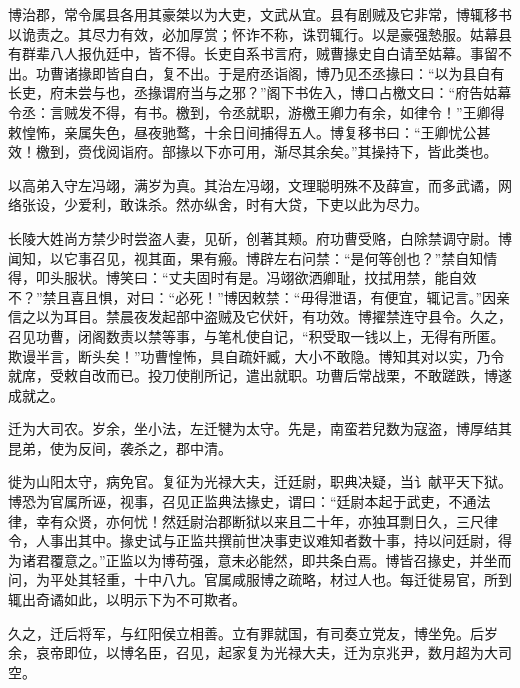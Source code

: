 \documentclass[12pt,UTF8]{ctexbook}
\begin{document}
博治郡，常令属县各用其豪桀以为大吏，文武从宜。县有剧贼及它非常，博辄移书以诡责之。其尽力有效，必加厚赏；怀诈不称，诛罚辄行。以是豪强慹服。姑幕县有群辈八人报仇廷中，皆不得。长吏自系书言府，贼曹掾史自白请至姑幕。事留不出。功曹诸掾即皆自白，复不出。于是府丞诣阁，博乃见丕丞掾曰：“以为县自有长吏，府未尝与也，丞掾谓府当与之邪？”阁下书佐入，博口占檄文曰：“府告姑幕令丞：言贼发不得，有书。檄到，令丞就职，游檄王卿力有余，如律令！”王卿得敕惶怖，亲属失色，昼夜驰鹜，十余日间捕得五人。博复移书曰：“王卿忧公甚效！檄到，赍伐阅诣府。部掾以下亦可用，渐尽其余矣。”其操持下，皆此类也。



以高弟入守左冯翊，满岁为真。其治左冯翊，文理聪明殊不及薛宣，而多武谲，网络张设，少爱利，敢诛杀。然亦纵舍，时有大贷，下吏以此为尽力。



长陵大姓尚方禁少时尝盗人妻，见斫，创著其颊。府功曹受赂，白除禁调守尉。博闻知，以它事召见，视其面，果有瘢。博辟左右问禁：“是何等创也？”禁自知情得，叩头服状。博笑曰：“丈夫固时有是。冯翊欲洒卿耻，抆拭用禁，能自效不？”禁且喜且惧，对曰：“必死！”博因敕禁：“毋得泄语，有便宜，辄记言。”因亲信之以为耳目。禁晨夜发起部中盗贼及它伏奸，有功效。博擢禁连守县令。久之，召见功曹，闭阁数责以禁等事，与笔札使自记，“积受取一钱以上，无得有所匿。欺谩半言，断头矣！”功曹惶怖，具自疏奸臧，大小不敢隐。博知其对以实，乃令就席，受敕自改而已。投刀使削所记，遣出就职。功曹后常战栗，不敢蹉跌，博遂成就之。



迁为大司农。岁余，坐小法，左迁犍为太守。先是，南蛮若兒数为寇盗，博厚结其昆弟，使为反间，袭杀之，郡中清。



徙为山阳太守，病免官。复征为光禄大夫，迁廷尉，职典决疑，当讠献平天下狱。博恐为官属所诬，视事，召见正监典法掾史，谓曰：“廷尉本起于武吏，不通法律，幸有众贤，亦何忧！然廷尉治郡断狱以来且二十年，亦独耳剽日久，三尺律令，人事出其中。掾史试与正监共撰前世决事吏议难知者数十事，持以问廷尉，得为诸君覆意之。”正监以为博苟强，意未必能然，即共条白焉。博皆召掾史，并坐而问，为平处其轻重，十中八九。官属咸服博之疏略，材过人也。每迁徙易官，所到辄出奇谲如此，以明示下为不可欺者。



久之，迁后将军，与红阳侯立相善。立有罪就国，有司奏立党友，博坐免。后岁余，哀帝即位，以博名臣，召见，起家复为光禄大夫，迁为京兆尹，数月超为大司空。
\end{document}
